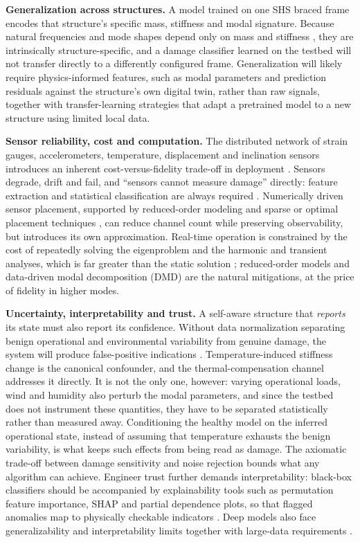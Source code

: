 \textbf{Generalization across structures.} A model trained on one SHS braced frame encodes that structure's specific mass, stiffness and modal signature. Because natural frequencies and mode shapes depend only on mass and stiffness \citep{chopra2017dynamics}, they are intrinsically structure-specific, and a damage classifier learned on the testbed will not transfer directly to a differently configured frame. Generalization will likely require physics-informed features, such as modal parameters and prediction residuals against the structure's own digital twin, rather than raw signals, together with transfer-learning strategies \citep{naser2023ml,karaaslan2021attention} that adapt a pretrained model to a new structure using limited local data.

\textbf{Sensor reliability, cost and computation.} The distributed network of strain gauges, accelerometers, temperature, displacement and inclination sensors introduces an inherent cost-versus-fidelity trade-off in deployment \citep{farrar2013shm}. Sensors degrade, drift and fail, and ``sensors cannot measure damage'' directly: feature extraction and statistical classification are always required \citep{farrar2013shm}. Numerically driven sensor placement, supported by reduced-order modeling and sparse or optimal placement techniques \citep{brunton2019data,tan2020sensorplacement,hassani2023sensorplacement}, can reduce channel count while preserving observability, but introduces its own approximation. Real-time operation is constrained by the cost of repeatedly solving the eigenproblem and the harmonic and transient analyses, which is far greater than the static solution \citep{cook2002fea}; reduced-order models and data-driven modal decomposition (DMD) \citep{brunton2019data} are the natural mitigations, at the price of fidelity in higher modes.

\textbf{Uncertainty, interpretability and trust.} A self-aware structure that \textit{reports} its state must also report its confidence. Without data normalization separating benign operational and environmental variability from genuine damage, the system will produce false-positive indications \citep{farrar2013shm,figueiredo2010machine}. Temperature-induced stiffness change is the canonical confounder, and the thermal-compensation channel addresses it directly. It is not the only one, however: varying operational loads, wind and humidity also perturb the modal parameters, and since the testbed does not instrument these quantities, they have to be separated statistically rather than measured away. Conditioning the healthy model on the inferred operational state, instead of assuming that temperature exhausts the benign variability, is what keeps such effects from being read as damage. The axiomatic trade-off between damage sensitivity and noise rejection \citep{farrar2013shm} bounds what any algorithm can achieve. Engineer trust further demands interpretability: black-box classifiers should be accompanied by explainability tools such as permutation feature importance, SHAP and partial dependence plots, so that flagged anomalies map to physically checkable indicators \citep{naser2023ml}. Deep models also face generalizability and interpretability limits together with large-data requirements \citep{brunton2019data}.

